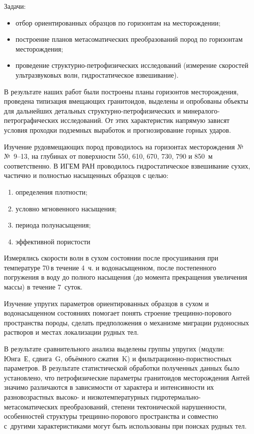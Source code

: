Задачи:
\begin{itemize}[noitemsep]\vspace{-8pt}
  \item отбор ориентированных образцов по горизонтам на месторождении;
  \item построение планов метасоматических преобразований пород по горизонтам месторождения;
  \item проведение структурно-петрофизических исследований (измерение скоростей ультразвуковых волн, гидростатическое взвешивание).
\end{itemize}
 \vspace{-6pt}

В результате наших работ были построены планы горизонтов месторождения, проведена типизация вмещающих гранитоидов, выделены и опробованы объекты для дальнейших детальных структурно-петрофизических и минералого-петрографических исследований. От этих характеристик напрямую зависят условия проходки подземных выработок и прогнозирование горных ударов.

Изучение рудовмещающих пород проводилось на горизонтах месторождения №№~9--13, на глубинах от поверхности 550, 610, 670, 730, 790 и 850~м соответственно. В ИГЕМ РАН проводилось гидростатическое взвешивание сухих, частично и полностью насыщенных образцов с целью:
\begin{enumerate}[noitemsep]\vspace{-8pt}
  \item определения плотности;
  \item условно мгновенного насыщения;
  \item периода полунасыщения;
  \item эффективной пористости
\end{enumerate}
 \vspace{-8pt}
Измерялись скорости волн в сухом состоянии после просушивания при температуре 70\,\dgc в течение 4~ч. и водонасыщенном, после постепенного погружения в воду до полного насыщения (до момента прекращения увеличения массы) в течение 7~суток.

Изучение упругих параметров ориентированных образцов в сухом и водонасыщенном состояниях помогает понять строение трещинно-порового пространства породы, сделать предположения о механизме миграции рудоносных растворов и местах локализации рудных тел.

В результате сравнительного анализа выделены группы упругих (модули: Юнга~Е, сдвига~G, объёмного сжатия~K) и фильтрационно-пористностных параметров. В результате статистической обработки полученных данных было установлено, что петрофизические параметры гранитоидов месторождения Антей значимо различаются в зависимости от характера и интенсивности их разновозрастных высоко- и низкотемпературных гидротермально-метасоматических преобразований, степени тектонической нарушенности, особенностей структуры трещинно-порового пространства и совместно с~другими характеристиками могут быть использованы при поисках рудных тел.

